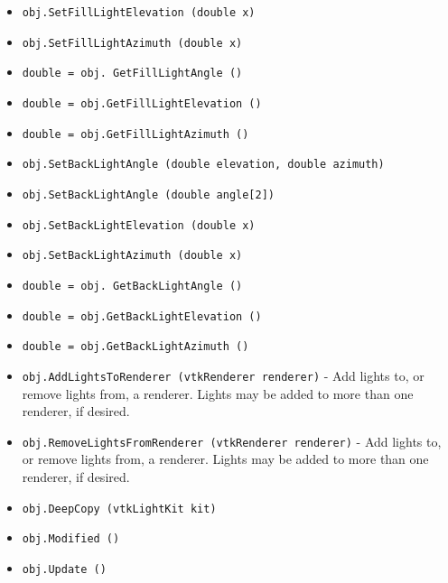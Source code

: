 \begin{itemize}
\item  \verb|obj.SetFillLightElevation (double x)|

\item  \verb|obj.SetFillLightAzimuth (double x)|

\item  \verb|double = obj. GetFillLightAngle ()|

\item  \verb|double = obj.GetFillLightElevation ()|

\item  \verb|double = obj.GetFillLightAzimuth ()|

\item  \verb|obj.SetBackLightAngle (double elevation, double azimuth)|

\item  \verb|obj.SetBackLightAngle (double angle[2])|

\item  \verb|obj.SetBackLightElevation (double x)|

\item  \verb|obj.SetBackLightAzimuth (double x)|

\item  \verb|double = obj. GetBackLightAngle ()|

\item  \verb|double = obj.GetBackLightElevation ()|

\item  \verb|double = obj.GetBackLightAzimuth ()|

\item  \verb|obj.AddLightsToRenderer (vtkRenderer renderer)| -  Add lights to, or remove lights from, a renderer.  
 Lights may be added to more than one renderer, if desired.

\item  \verb|obj.RemoveLightsFromRenderer (vtkRenderer renderer)| -  Add lights to, or remove lights from, a renderer.  
 Lights may be added to more than one renderer, if desired.

\item  \verb|obj.DeepCopy (vtkLightKit kit)|

\item  \verb|obj.Modified ()|

\item  \verb|obj.Update ()|

\end{itemize}
